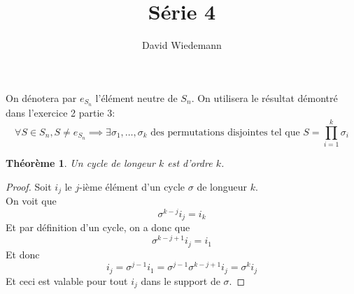 \documentclass[11pt, a4paper]{article}
\newtheorem{theorem}{Théorème}
\begin{document}
\title{Série 4}
\author{David Wiedemann}
\maketitle
On dénotera par $e_{S_n} $ l'élément neutre de $S_n$.
On utilisera le résultat démontré dans l'exercice 2 partie 3:
\[ 
	\forall S \in S_n, S \neq e_{S_n}  \implies \exists \sigma_1,\ldots,\sigma_k \text{ des permutations disjointes tel que } S = \prod_{i=1} ^{k} \sigma_i
\]

\begin{theorem}
Un cycle de longeur $k$ est d'ordre $k$.
\end{theorem}
\begin{proof}
 	Soit $i_j$ le $j$-ième élément d'un cycle $\sigma$ de longueur $k$.\\
	On voit que
	\[ 
	\sigma^{k-j} i_j = i_k
	\]
	Et par définition d'un cycle, on a donc que 
	\[ 
	\sigma^{k-j+1} i_j = i_1
	\]
	Et donc 
	\[ 
	i_j =\sigma^{j-1} i_1 = \sigma^{j-1} \sigma^{k-j+1} i_j = \sigma^{k} i_j
	\]
	Et ceci est valable pour tout $i_j$ dans le support de $\sigma$.	
\end{proof}
\end{document}
